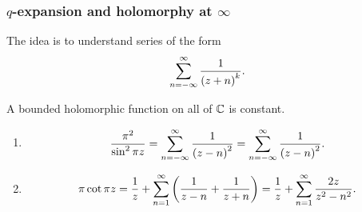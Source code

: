 \subsubsection{\texorpdfstring{$ q $}{q}-expansion and holomorphy at \texorpdfstring{$ \infty $}{infinity}}

The idea is to understand series of the form
$$ \sum_{n = -\infty}^\infty \dfrac{1}{\br{z + n}^k}. $$

\begin{theorem}
A bounded holomorphic function on all of $ \mathbb{C} $ is constant.
\end{theorem}

\begin{lemma}
\hfill
\begin{enumerate}
\item
$$ \dfrac{\pi^2}{\sin^2 \pi z} = \sum_{n = -\infty}^\infty \dfrac{1}{\br{z - n}^2} = \sum_{n = -\infty}^\infty \dfrac{1}{\br{z - n}^2}. $$
\item
$$ \pi\cot \pi z = \dfrac{1}{z} + \sum_{n = 1}^\infty \br{\dfrac{1}{z - n} + \dfrac{1}{z + n}} = \dfrac{1}{z} + \sum_{n = 1}^\infty \dfrac{2z}{z^2 - n^2}. $$
\end{enumerate}
\end{lemma}

